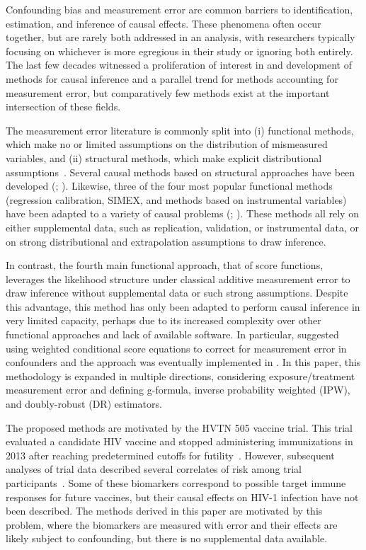 \documentclass[useAMS,usenatbib,referee]{biom}
\begin{document}
Confounding bias and measurement error are common barriers to identification, estimation, and inference of causal effects. These phenomena often occur together, but are rarely both addressed in an analysis, with researchers typically focusing on whichever is more egregious in their study or ignoring both entirely. The last few decades witnessed a proliferation of interest in and development of methods for causal inference and a parallel trend for methods accounting for measurement error, but comparatively few methods exist at the important intersection of these fields.

The measurement error literature is commonly split into (i) functional methods, which make no or limited assumptions on the distribution of mismeasured variables, and (ii) structural methods, which make explicit distributional assumptions~\citep{carroll2006}. Several causal methods based on structural approaches have been developed (\citealp{kuroki2014,edwards2015multiple,braun2017}; \citealp*{hong2017}). Likewise, three of the four most popular functional methods (regression calibration, SIMEX, and methods based on instrumental variables) have been adapted to a variety of causal problems (\citealp*{vansteelandt2009}; \citealp{cole2010,kendall2015,lockwood2015,kyle2016,wu2019}). These methods all rely on either supplemental data, such as replication, validation, or instrumental data, or on strong distributional and extrapolation assumptions to draw inference.

In contrast, the fourth main functional approach, that of score functions, leverages the likelihood structure under classical additive measurement error to draw inference without supplemental data or such strong assumptions. Despite this advantage, this method has only been adapted to perform causal inference in very limited capacity, perhaps due to its increased complexity over other functional approaches and lack of available software. In particular, \citet*{mccaffrey2013} suggested using weighted conditional score equations to correct for measurement error in confounders and the approach was eventually implemented in \citet{shu2019}. In this paper, this methodology is expanded in multiple directions, considering exposure/treatment measurement error and defining g-formula, inverse probability weighted (IPW), and doubly-robust (DR) estimators.

The proposed methods are motivated by the HVTN 505 vaccine trial. This trial evaluated a candidate HIV vaccine and stopped administering immunizations in 2013 after reaching predetermined cutoffs for futility~\citep{hammer2013}. However, subsequent analyses of trial data described several correlates of risk among trial participants~\citep{decamp2017,janes2017,fong2018,neidich2019}. Some of these biomarkers correspond to possible target immune responses for future vaccines, but their causal effects on HIV-1 infection have not been described. The methods derived in this paper are motivated by this problem, where the biomarkers are measured with error and their effects are likely subject to confounding, but there is no supplemental data available.
\end{document}
